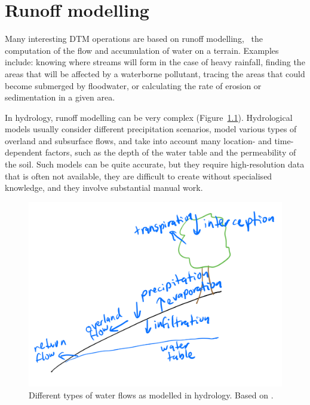 

\setchapterpreamble[u]{\margintoc}


\graphicspath{{runoff/}}


\chapter{Runoff modelling}%
\label{chap:runoff}

Many interesting DTM operations are based on runoff modelling, \ie\ the computation of the flow and accumulation of water on a terrain.
Examples include: knowing where streams will form in the case of heavy rainfall, finding the areas that will be affected by a waterborne pollutant, tracing the areas that could become submerged by floodwater, or calculating the rate of erosion or sedimentation in a given area.

In hydrology, runoff modelling can be very complex (Figure~\ref{fig:hydrology}).
Hydrological models usually consider different precipitation scenarios, model various types of overland and subsurface flows, and take into account many location- and time-dependent factors, such as the depth of the water table and the permeability of the soil.
Such models can be quite accurate, but they require high-resolution data that is often not available, they are difficult to create without specialised knowledge, and they involve substantial manual work.

\begin{figure}
\centering
\includegraphics[width=0.95\linewidth]{figs/hydrology.pdf}
\caption{Different types of water flows as modelled in hydrology. Based on \citet{Beven12}.}%
\label{fig:hydrology}
\end{figure}

